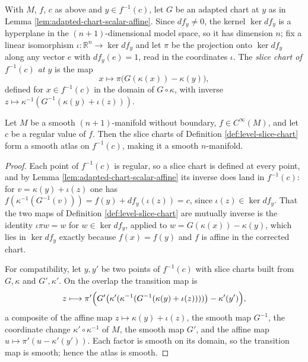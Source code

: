\begin{definition}
\label{def:level-slice-chart}
\leanok
{}
With $M$, $f$, $c$ as above and $y \in f^{-1}(c)$, let $G$ be an adapted chart at $y$ as in Lemma \ref{lem:adapted-chart-scalar-affine}. Since $df_y \neq 0$, the kernel $\ker df_y$ is a hyperplane in the $(n+1)$-dimensional model space, so it has dimension $n$; fix a linear isomorphism $\iota : \mathbb{R}^n \to \ker df_y$ and let $\pi$ be the projection onto $\ker df_y$ along any vector $e$ with $df_y(e) = 1$, read in the coordinates $\iota$. The \emph{slice chart of $f^{-1}(c)$ at $y$} is the map
\[
  x \longmapsto \pi\bigl(G(\kappa(x)) - \kappa(y)\bigr),
\]
defined for $x \in f^{-1}(c)$ in the domain of $G \circ \kappa$, with inverse $z \mapsto \kappa^{-1}(G^{-1}(\kappa(y) + \iota(z)))$.
\end{definition}

\begin{proposition}
\label{prop:regular-level-set-hypersurface-codim-one}
\leanok
{}
Let $M$ be a smooth $(n+1)$-manifold without boundary, $f \in C^\infty(M)$, and let $c$ be a regular value of $f$. Then the slice charts of Definition \ref{def:level-slice-chart} form a smooth atlas on $f^{-1}(c)$, making it a smooth $n$-manifold.
\end{proposition}

\begin{proof}
\leanok
{}
Each point of $f^{-1}(c)$ is regular, so a slice chart is defined at every point, and by Lemma \ref{lem:adapted-chart-scalar-affine} its inverse does land in $f^{-1}(c)$: for $v = \kappa(y) + \iota(z)$ one has $f(\kappa^{-1}(G^{-1}(v))) = f(y) + df_y(\iota(z)) = c$, since $\iota(z) \in \ker df_y$. That the two maps of Definition \ref{def:level-slice-chart} are mutually inverse is the identity $\iota\pi w = w$ for $w \in \ker df_y$, applied to $w = G(\kappa(x)) - \kappa(y)$, which lies in $\ker df_y$ exactly because $f(x) = f(y)$ and $f$ is affine in the corrected chart.

For compatibility, let $y, y'$ be two points of $f^{-1}(c)$ with slice charts built from $G, \kappa$ and $G', \kappa'$. On the overlap the transition map is
\[
  z \longmapsto \pi'\Bigl( G'\bigl(\kappa'(\kappa^{-1}(G^{-1}(\kappa(y) + \iota(z))))\bigr) - \kappa'(y') \Bigr),
\]
a composite of the affine map $z \mapsto \kappa(y) + \iota(z)$, the smooth map $G^{-1}$, the coordinate change $\kappa' \circ \kappa^{-1}$ of $M$, the smooth map $G'$, and the affine map $u \mapsto \pi'(u - \kappa'(y'))$. Each factor is smooth on its domain, so the transition map is smooth; hence the atlas is smooth.
\end{proof}

